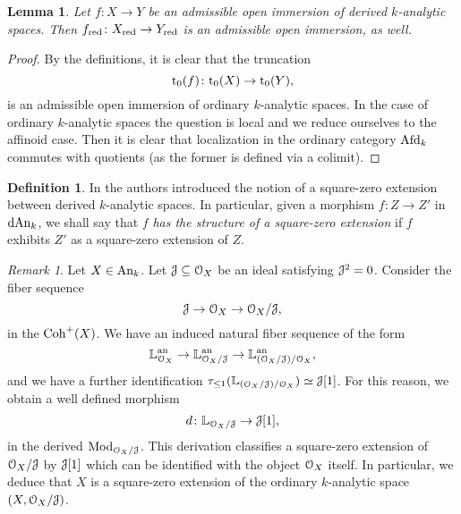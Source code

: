 \documentclass[10pt,a4paper,reqno]{amsart} %
\theoremstyle{plain}
\newtheorem{lem}[thm]{Lemma}
\theoremstyle{definition}
\newtheorem{defin}[thm]{Definition}
\theoremstyle{remark}
\newtheorem{rem}[thm]{Remark}
\numberwithin{equation}{section}
\begin{document}
\begin{lem}
    Let $f \colon X \to Y$ be an admissible open immersion of derived $k$-analytic spaces. Then $f_{\mathrm{red}} \colon X_{\mathrm{red}} \to Y_{\mathrm{red}}$ is
    an admissible open immersion, as well.
\end{lem}

\begin{proof}
    By the definitions, it is clear that the truncation
        \[
            \mathrm{t}_0(f) \colon \mathrm{t}_0(X) \to \mathrm{t}_0(Y),  
        \]
    is an admissible open immersion of ordinary $k$-analytic spaces. In the case of ordinary $k$-analytic spaces the question is local and we reduce ourselves to the affinoid case.
    Then it is clear that localization in the ordinary category $\mathrm{Afd}_k$ commutes with quotients (as the former is defined via a colimit).
\end{proof}

\begin{defin}
    In \cite[Definition 5.41]{Porta_Yu_Representability} the authors introduced the notion of a square-zero extension between derived
    $k$-analytic spaces. In particular, given a morphism $f \colon Z \to Z'$ in $\mathrm{dAn}_k$, we shall say that $f$ \emph{has the structure of
    a square-zero extension} if $f$ exhibits $Z'$ as a square-zero extension of $Z$.
\end{defin}

\begin{rem} \label{rem:construction_of_nilpotent_extensions_as_square_zero_extensions}
    Let $X \in \mathrm{An}_k$. Let $\mathcal J \subseteq \mathcal O_X$ be an ideal satisfying $\mathcal J^2 = 0$. Consider the fiber sequence
        \[
            \mathcal J \to \mathcal O_X \to \mathcal O_X/\mathcal J,  
        \]
    in the \infcat $\mathrm{Coh}^+(X)$. We have an induced natural fiber sequence of the form
        \[
            \mathbb L_{\mathcal O_X}^\mathrm{an} \to \mathbb L_{\mathcal O_X / \mathcal J}^\mathrm{an} \to \mathbb L_{(\mathcal O_X / \mathcal J) / \mathcal O_X}^\mathrm{an},
        \]
    and we have a further identification $\tau_{\le 1} (\mathbb L_{(\mathcal O_X/ \mathcal J) / \mathcal O_X}) \simeq \mathcal J[1]$. For this reason, we obtain a well defined morphism
        \[
            d \colon \mathbb L_{\mathcal O_X/ \mathcal J} \to \mathcal J[1],
        \]
    in the derived \infcat $\mathrm{Mod}_{\mathcal O_X/ \mathcal J}$. This derivation classifies a square-zero extension of $\mathcal O_X/ \mathcal J$ by $\mathcal J[1]$ which can be identified with the
    object $\mathcal O_X$ itself. In particular, we deduce that $X$ is a square-zero extension of the ordinary $k$-analytic space $(X, \mathcal O_{X}/\mathcal J)$.
\end{rem}
\end{document}
